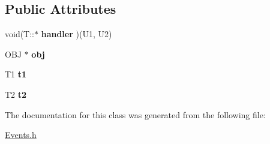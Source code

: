 \subsection*{Public Attributes}
\begin{DoxyCompactItemize}
\item 
\hypertarget{class_event2_a166c37cb53b2969dac38fa79b0349768}{void(T\-::$\ast$ {\bfseries handler} )(U1, U2)}\label{class_event2_a166c37cb53b2969dac38fa79b0349768}

\item 
\hypertarget{class_event2_ae87200a757f09d76ae6aa5abd293f062}{O\-B\-J $\ast$ {\bfseries obj}}\label{class_event2_ae87200a757f09d76ae6aa5abd293f062}

\item 
\hypertarget{class_event2_ab3e9b3c8ae4bff79e765e54a4947f371}{T1 {\bfseries t1}}\label{class_event2_ab3e9b3c8ae4bff79e765e54a4947f371}

\item 
\hypertarget{class_event2_ad921b4a0baa31fa2400fd022bf3b43e9}{T2 {\bfseries t2}}\label{class_event2_ad921b4a0baa31fa2400fd022bf3b43e9}

\end{DoxyCompactItemize}


The documentation for this class was generated from the following file\-:\begin{DoxyCompactItemize}
\item 
\hyperlink{_events_8h}{Events.\-h}\end{DoxyCompactItemize}
